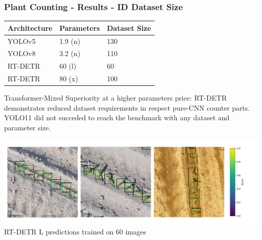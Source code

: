\documentclass[aspectratio=43]{beamer}
\begin{document}
\begin{frame}
    \frametitle{Plant Counting - Results - ID Dataset Size}

    \begin{table}[H]
        \scriptsize
        \begin{tabularx}{\textwidth}{lXX}
        \toprule
        \textbf{Architecture} &\textbf{Parameters} & \textbf{Dataset Size} \\
        \midrule
        YOLOv5 & 1.9 (n) & 130 \\
        YOLOv8 & 3.2 (n) & 110 \\
        RT-DETR & 60 (l) & 60 \\
        RT-DETR & 80 (x) & 100 \\
        \bottomrule
        \end{tabularx}
    \end{table}

    \begin{block}{\scriptsize Transformer-Mixed Superiority at a higher parameters price:}
        \scriptsize
        RT-DETR demonstrates reduced dataset requirements in respect pure-CNN counter parts. YOLO11 did not succeded to reach the benchmark with any dataset and parameter size. 
    \end{block}

    \begin{center}
        \includegraphics[width=1\textwidth]{Imgs/many_shot_size_annotations.pdf}
        \tiny RT-DETR L predictions trained on 60 images
    \end{center}
\end{frame}
\end{document}
